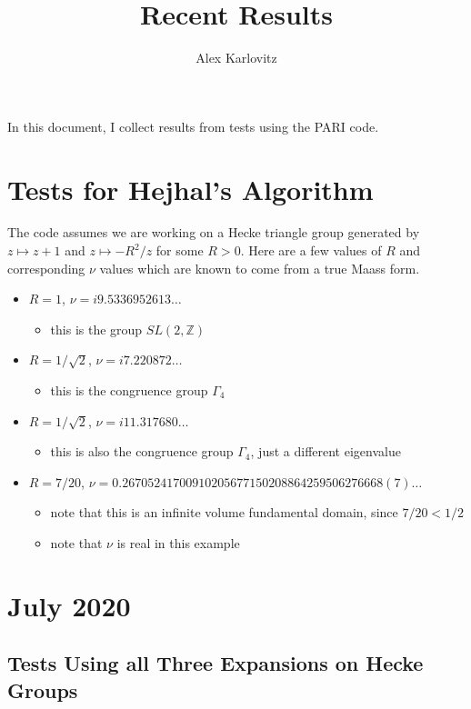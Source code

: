 \documentclass[]{article}
\title{Recent Results}
\author{Alex Karlovitz}
\date{}
\begin{document}
	
	\maketitle
	
In this document, I collect results from tests using the PARI code.

\section*{Tests for Hejhal's Algorithm}

The code assumes we are working on a Hecke triangle group generated by $z \mapsto z + 1$ and $z \mapsto -R^2/z$ for some $R > 0$.
Here are a few values of $R$ and corresponding $\nu$ values which are known to come from a true Maass form.
\begin{itemize}
	\item $R = 1$, $\nu = i9.5336952613\dots$
	\begin{itemize}
		\item this is the group $SL(2, \mathbb{Z})$
	\end{itemize}
	\item $R = 1/\sqrt{2}$, $\nu = i7.220872\dots$
	\begin{itemize}
		\item this is the congruence group $\Gamma_4$
	\end{itemize}
	\item $R = 1/\sqrt{2}$, $\nu = i11.317680\dots$
	\begin{itemize}
		\item this is also the congruence group $\Gamma_4$, just a different eigenvalue
	\end{itemize}
	\item $R = 7/20$, $\nu = 0.26705241700910205677150208864259506276668(7)\dots$
	\begin{itemize}
		\item note that this is an infinite volume fundamental domain, since $7/20 < 1/2$
		\item note that $\nu$ is real in this example
	\end{itemize}
\end{itemize}

\section*{July 2020}

\subsection*{Tests Using all Three Expansions on Hecke Groups}
\end{document}
